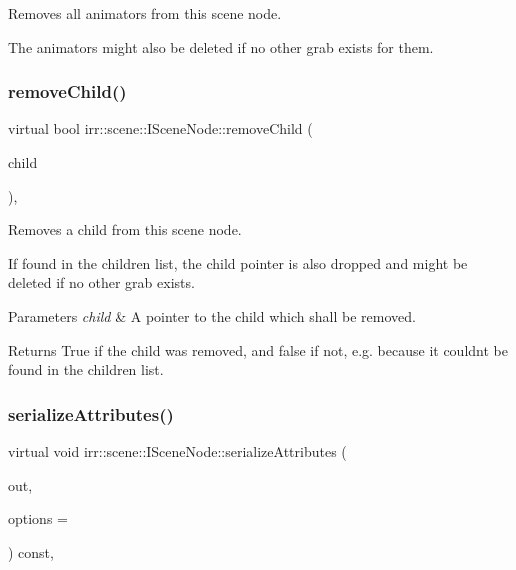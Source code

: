 Removes all animators from this scene node. 

The animators might also be deleted if no other grab exists for them. \mbox{\label{classirr_1_1scene_1_1ISceneNode_a831e371142fc883c7dd229552e0340de}} 
\subsubsection{\texorpdfstring{remove\+Child()}{removeChild()}}
{\footnotesize\ttfamily virtual bool irr\+::scene\+::\+I\+Scene\+Node\+::remove\+Child (\begin{DoxyParamCaption}\item[{\hyperlink{classirr_1_1scene_1_1ISceneNode}{I\+Scene\+Node} $\ast$}]{child }\end{DoxyParamCaption})\hspace{0.3cm}{\ttfamily [inline]}, {\ttfamily [virtual]}}



Removes a child from this scene node. 

If found in the children list, the child pointer is also dropped and might be deleted if no other grab exists. 
\begin{DoxyParams}{Parameters}
{\em child} & A pointer to the child which shall be removed. \\
\hline
\end{DoxyParams}
\begin{DoxyReturn}{Returns}
True if the child was removed, and false if not, e.\+g. because it couldn\textquotesingle{}t be found in the children list. 
\end{DoxyReturn}
\mbox{\label{classirr_1_1scene_1_1ISceneNode_a3210345b70227c03c7f889c94754fdaa}} 
\subsubsection{\texorpdfstring{serialize\+Attributes()}{serializeAttributes()}}
{\footnotesize\ttfamily virtual void irr\+::scene\+::\+I\+Scene\+Node\+::serialize\+Attributes (\begin{DoxyParamCaption}\item[{\hyperlink{classirr_1_1io_1_1IAttributes}{io\+::\+I\+Attributes} $\ast$}]{out,  }\item[{\hyperlink{structirr_1_1io_1_1SAttributeReadWriteOptions}{io\+::\+S\+Attribute\+Read\+Write\+Options} $\ast$}]{options = {} }\end{DoxyParamCaption}) const\hspace{0.3cm}{\ttfamily [inline]}, {\ttfamily [virtual]}}



